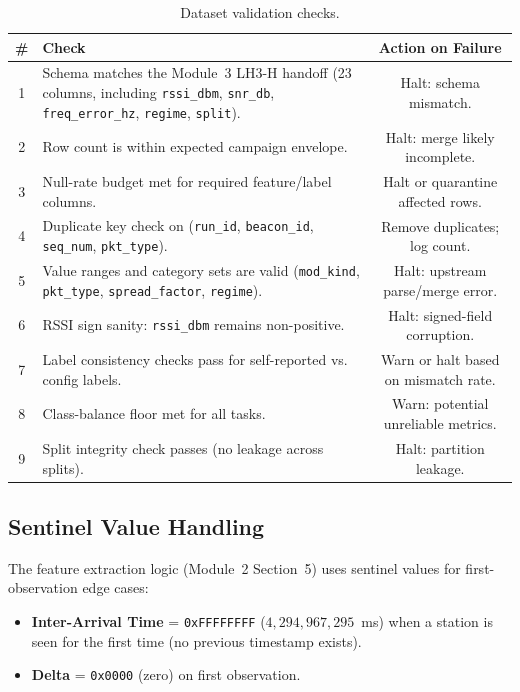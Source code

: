 \documentclass[11pt,letterpaper]{article}
\begin{document}
	\begin{table}[ht!]
		\centering
		\caption{Dataset validation checks.}
		\label{tab:validation}
		\renewcommand{\arraystretch}{1.3}
		\begin{tabularx}{\textwidth}{c X c}
			\toprule
			\textbf{\#} & \textbf{Check} & \textbf{Action on Failure} \\
			\midrule
			1 & Schema matches the Module~3 LH3-H handoff (23 columns, including \texttt{rssi\_dbm}, \texttt{snr\_db}, \texttt{freq\_error\_hz}, \texttt{regime}, \texttt{split}). & Halt: schema mismatch. \\
			2 & Row count is within expected campaign envelope. & Halt: merge likely incomplete. \\
			3 & Null-rate budget met for required feature/label columns. & Halt or quarantine affected rows. \\
			4 & Duplicate key check on (\texttt{run\_id}, \texttt{beacon\_id}, \texttt{seq\_num}, \texttt{pkt\_type}). & Remove duplicates; log count. \\
			5 & Value ranges and category sets are valid (\texttt{mod\_kind}, \texttt{pkt\_type}, \texttt{spread\_factor}, \texttt{regime}). & Halt: upstream parse/merge error. \\
			6 & RSSI sign sanity: \texttt{rssi\_dbm} remains non-positive. & Halt: signed-field corruption. \\
			7 & Label consistency checks pass for self-reported vs. config labels. & Warn or halt based on mismatch rate. \\
			8 & Class-balance floor met for all tasks. & Warn: potential unreliable metrics. \\
			9 & Split integrity check passes (no leakage across splits). & Halt: partition leakage. \\
			\bottomrule
		\end{tabularx}
	\end{table}

	\subsection{Sentinel Value Handling}

	The \FPGA{} feature extraction logic (Module~2 Section~5) uses sentinel values for first-observation edge cases:

	\begin{itemize}[leftmargin=2em]
		\item \textbf{Inter-Arrival Time} = \texttt{0xFFFFFFFF} ($4{,}294{,}967{,}295$~ms) when a station is seen for the first time (no previous timestamp exists).
		\item \textbf{\RSSI{} Delta} = \texttt{0x0000} (zero) on first observation.
	\end{itemize}
\end{document}
